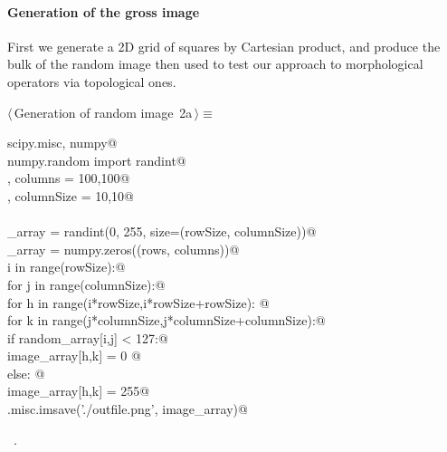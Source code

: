 \documentclass[11pt,oneside]{article}	%
\begin{document}
\paragraph{Generation of the gross image}
First we generate a 2D grid of squares by Cartesian product, and produce the bulk of the random image then used to test our approach to morphological operators via topological ones.


%
%
%

\begin{flushleft} \small
\begin{minipage}{\linewidth} \label{scrap1}
\protect{}$\langle\,$Generation of random image\nobreak\ {\footnotesize 2a}$\,\rangle\equiv$
\vspace{-1ex}
\begin{list}{}{} \item
\mbox{}\verb@import scipy.misc, numpy@\\
\mbox{}\verb@from numpy.random import randint@\\
\mbox{}\verb@rows, columns = 100,100@\\
\mbox{}\verb@rowSize, columnSize = 10,10@\\
\mbox{}\verb@@\\
\mbox{}\verb@random_array = randint(0, 255, size=(rowSize, columnSize))@\\
\mbox{}\verb@image_array = numpy.zeros((rows, columns))@\\
\mbox{}\verb@for i in range(rowSize):@\\
\mbox{}\verb@   for j in range(columnSize):@\\
\mbox{}\verb@      for h in range(i*rowSize,i*rowSize+rowSize): @\\
\mbox{}\verb@         for k in range(j*columnSize,j*columnSize+columnSize):@\\
\mbox{}\verb@            if random_array[i,j] < 127:@\\
\mbox{}\verb@               image_array[h,k] = 0 @\\
\mbox{}\verb@            else: @\\
\mbox{}\verb@               image_array[h,k] = 255@\\
\mbox{}\verb@scipy.misc.imsave('./outfile.png', image_array)@\\
\mbox{}\verb@@{\NWsep}
\end{list}
\vspace{-1ex}
\footnotesize\addtolength{\baselineskip}{-1ex}
\begin{list}{}{\setlength{\itemsep}{-\parsep}\setlength{\itemindent}{-\leftmargin}}
\item \NWtxtMacroRefIn\ .
\end{list}
\end{minipage}\\[4ex]
\end{flushleft}
\end{document}
